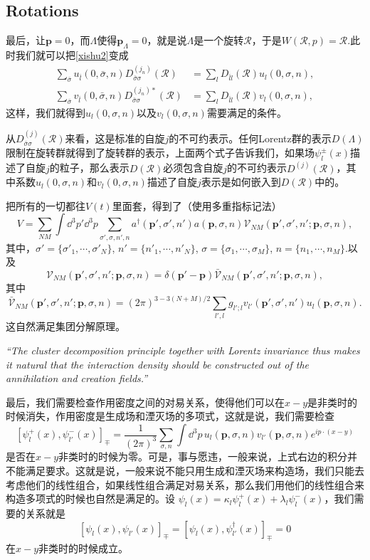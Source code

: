 \documentclass[9pt]{extbook}
\theoremstyle{plain}%
\newcommand{\re}[1]
	{\begin{center}
		\colorbox{shadecolor}{
		\begin{minipage}{135mm}
				\emph{``#1''}
			\end{minipage}}
	\end{center}}
\begin{document}
\subsection*{Rotations}
最后，让$\mathbf{p}=0$，而$\Lambda$使得$\mathbf{p}_\Lambda=0$，就是说$\Lambda$是一个旋转$\mathscr{R}$，于是$W(\mathscr{R},p)=\mathscr{R}$.此时我们就可以把\eqref{xishu2}变成
\[
	\begin{split}
		\sum_{\bar{\sigma}}u_{\bar{l}}(0,\bar{\sigma},n)D^{(j_n)}_{\bar{\sigma}\sigma}\left(\mathscr{R}\right) & =\sum_{l} D_{\bar{l}l}(\mathscr{R})u_{l}(0,\sigma,n),\\
		\sum_{\bar{\sigma}}v_{\bar{l}}(0,\bar{\sigma},n)D^{(j_n)*}_{\bar{\sigma}\sigma}\left(\mathscr{R}\right) & =\sum_{l} D_{\bar{l}l}(\mathscr{R})v_{l}(0,\sigma,n),
	\end{split}
\]
这样，我们就得到$u_{l}(0,\sigma,n)$以及$v_{l}(0,\sigma,n)$需要满足的条件。

从$D^{(j)}_{\bar{\sigma}\sigma}\left(\mathscr{R}\right)$来看，这是标准的自旋$j$的不可约表示。任何Lorentz群的表示$D(\Lambda)$限制在旋转群就得到了旋转群的表示，上面两个式子告诉我们，如果场$\psi^\pm_l(x)$描述了自旋$j$的粒子，那么表示$D(\mathscr{R})$必须包含自旋$j$的不可约表示$D^{(j)}\left(\mathscr{R}\right)$，其中系数$u_{l}(0,\sigma,n)$和$v_{l}(0,\sigma,n)$描述了自旋$j$表示是如何嵌入到$D(\mathscr{R})$中的。

把所有的一切都往$V(t)$里面套，得到了（使用多重指标记法）
\[
	V=\sum_{NM}\int \dd^3 p'\dd^3 p \sum_{\sigma',\sigma,n',n}a^\dag(\mathbf{p}',\sigma',n')a(\mathbf{p},\sigma,n)\mathscr{V}_{NM}(\mathbf{p}',\sigma',n';\mathbf{p},\sigma,n),
\]
其中，$\sigma'=\{\sigma'_1,\cdots,\sigma'_N\}$, $n'=\{n'_1,\cdots,n'_N\}$, $\sigma=\{\sigma_1,\cdots,\sigma_M\}$, $n=\{n_1,\cdots,n_M\}$.以及
\[
	\mathscr{V}_{NM}(\mathbf{p}',\sigma',n';\mathbf{p},\sigma,n)=\delta(\mathbf{p}'-\mathbf{p})\bar{\mathscr{V}}_{NM}(\mathbf{p}',\sigma',n';\mathbf{p},\sigma,n),
\]
其中
\[
	\bar{\mathscr{V}}_{NM}(\mathbf{p}',\sigma',n';\mathbf{p},\sigma,n)=(2\pi)^{3-3(N+M)/2}\sum_{l',l}g_{l';l}v_{l'}(\mathbf{p}',\sigma',n')u_l(\mathbf{p},\sigma,n).
\]
这自然满足集团分解原理。
\re{The cluster decomposition principle together with Lorentz invariance thus makes it natural that the interaction density should be constructed out of the annihilation and creation fields.}

最后，我们需要检查作用密度之间的对易关系，使得他们可以在$x-y$是非类时的时候消失，作用密度是生成场和湮灭场的多项式，这就是说，我们需要检查
\[
	[\psi_l^+(x),\psi_{l'}^-(x)]_{\mp}=\frac{1}{(2\pi)^3}\sum_{\sigma,n}\int\dd^3 p\, u_{l}(\mathbf{p},\sigma,n)v_{l'}(\mathbf{p},\sigma,n)e^{ip\cdot (x-y)}
\]
是否在$x-y$非类时的时候为零。可是，事与愿违，一般来说，上式右边的积分并不能满足要求。这就是说，一般来说不能只用生成和湮灭场来构造场，我们只能去考虑他们的线性组合，如果线性组合满足对易关系，那么我们用他们的线性组合来构造多项式的时候也自然是满足的。设
$\psi_l(x)=\kappa_l\psi_l^+(x)+\lambda_l\psi_l^-(x)$，我们需要的关系就是
\[
	[\psi_l(x),\psi_{l'}(x)]_{\mp}=[\psi_l(x),\psi^\dag_{l'}(x)]_{\mp}=0
\]
在$x-y$非类时的时候成立。
\end{document}
